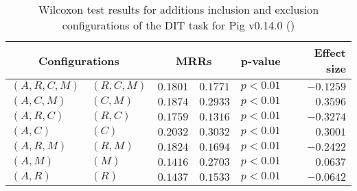 
\begin{table}
\begin{spacing}{1.2}
\centering
\caption{Wilcoxon test results for additions inclusion and exclusion configurations of the DIT task for Pig v0.14.0 (\ctwo)}
\label{table:versus-wilcox-pig-dit-additions}
\begin{tabular}{ll|rr|rr}
\toprule
      \multicolumn{2}{c|}{Configurations} &                \multicolumn{2}{c|}{MRRs} &             p-value & Effect size \\
\midrule
 $(A,R,C,M)$ &  $(R,C,M)$ &  $\bm{0.1801}$ &       $0.1771$ & $p<0.01$ &   $-0.1259$ \\
   $(A,C,M)$ &    $(C,M)$ &       $0.1874$ &  $\bm{0.2933}$ & $p<0.01$ &    $0.3596$ \\
   $(A,R,C)$ &    $(R,C)$ &  $\bm{0.1759}$ &       $0.1316$ & $p<0.01$ &   $-0.3274$ \\
     $(A,C)$ &      $(C)$ &       $0.2032$ &  $\bm{0.3032}$ & $p<0.01$ &    $0.3001$ \\
   $(A,R,M)$ &    $(R,M)$ &  $\bm{0.1824}$ &       $0.1694$ & $p<0.01$ &   $-0.2422$ \\
     $(A,M)$ &      $(M)$ &       $0.1416$ &  $\bm{0.2703}$ & $p<0.01$ &    $0.0637$ \\
     $(A,R)$ &      $(R)$ &       $0.1437$ &  $\bm{0.1533}$ & $p<0.01$ &   $-0.0642$ \\
\bottomrule
\end{tabular}

\end{spacing}
\end{table}

